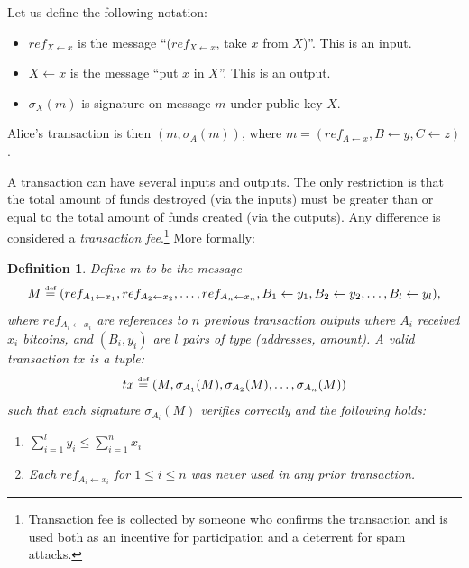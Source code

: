 \documentclass[]{report}   %
\newtheorem{definition}{Definition}
\newcommand{\sr}{\stackrel}
\newcommand{\ra}{\rightarrow}
\newcommand{\la}{\leftarrow}
\newcommand{\defined}{\stackrel{\mbox{\tiny{def}}}{=}}
\newcommand{\lea}{\leftarrow}
\begin{document}
Let us define the following notation:
\begin{itemize}
	\item $ref_{X \leftarrow x}$ is the message ``($ref_{X \leftarrow x}$, take $x$ from $X$)''. This is an input.
\item
$X \leftarrow x$ is the message ``put $x$ in $X$''. This is an output.
\item
$\sigma_X(m)$ is signature on message $m$ under public key $X$. %
\end{itemize}
Alice's transaction is then $(m, \sigma_A(m))$, where $m  =  (ref_{A \leftarrow x}, B \lea y, C \lea z)$.
 
A transaction can have several inputs and outputs. The only restriction is that the total amount of funds destroyed (via the inputs) must be greater than or equal to the total amount of funds created (via the outputs). Any difference is considered a {\em transaction fee}.\footnote{Transaction fee is collected by someone who confirms the transaction and is used both as an incentive for participation and a deterrent for spam attacks.} More formally:

\begin{definition}
Define $m$ to be the message
\[
M \defined (ref_{A_1\leftarrow x_1}, ref_{A_2\leftarrow x_2}, \ldots, ref_{A_n\leftarrow x_n}, B_1\la y_1,
B_2\la y_2, \ldots, B_l\la y_l), 
\] 
where $ref_{A_i\leftarrow x_i}$ are references to $n$ previous transaction outputs where $A_i$ received $x_i$ bitcoins, and $(B_i, y_i)$ are $l$ pairs of type (addresses, amount). 
A valid transaction $tx$ is a tuple: 
\begin{equation}\label{tx0}tx\defined (M, \sigma_{A_1}(M), \sigma_{A_2}(M), \ldots, \sigma_{A_n}(M))\end{equation} such that each signature $\sigma_{A_i}(M)$ verifies correctly and the following holds:
\begin{enumerate}
	\item $\sum_{i=1}^{l}y_i \leq \sum_{i=1}^{n}x_i$ 
	\item Each $ref_{A_i \leftarrow x_i}$ for $1\leq i\leq n$ was never used in any prior transaction.
\end{enumerate}
\end{definition}
\end{document}
